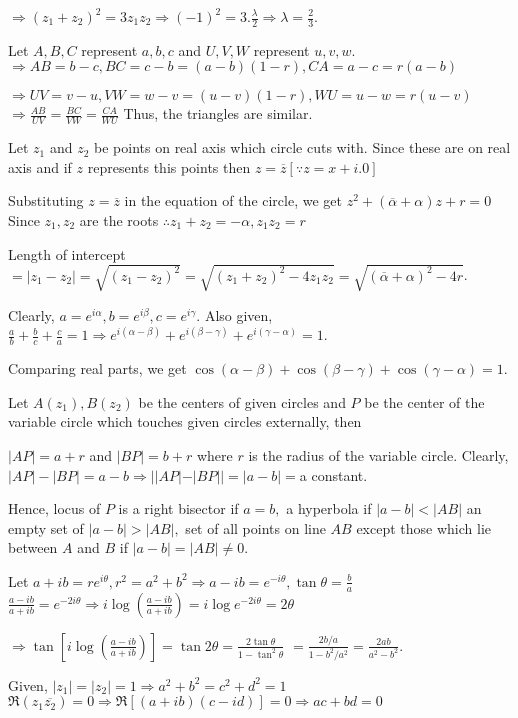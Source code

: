   $\Rightarrow (z_1 + z_2)^2 = 3z_1z_2 \Rightarrow (-1)^2 = 3.\frac{\lambda}{2}\Rightarrow \lambda =
  \frac{2}{3}$.
\item Let $A, B, C$ represent $a,b,c$ and $U, V, W$ represent $u, v, w.$
  $\Rightarrow AB = b - c, BC = c - b = (a - b)(1 - r), CA = a - c = r(a - b)$

  $\Rightarrow UV = v - u, VW = w - v = (u - v)(1 - r), WU = u - w = r(u - v)$
  $\Rightarrow \frac{AB}{UV} = \frac{BC}{VW} = \frac{CA}{WU}$
  Thus, the triangles are similar.
\item Let $z_1$ and $z_2$ be points on real axis which circle cuts with. Since these are on real axis and if $z$
  represents this points then $z = \overline{z}[\because z = x + i.0]$

  Substituting $z = \overline{z}$ in the equation of the circle, we get $z^2 + (\overline{\alpha} + \alpha)z + r = 0$
  Since $z_1, z_2$ are the roots $\therefore z_1 + z_2 = -\alpha, z_1z_2 = r$

  Length of intercept $=|z_1 - z_2| = \sqrt{(z_1 - z_2)^2} = \sqrt{(z_1 + z_2)^2 - 4z_1z_2} = \sqrt{(\overline{\alpha} + \alpha)^2
    - 4r}$.
\item Clearly, $a = e^{i\alpha}, b = e^{i\beta}, c= e^{i\gamma}$.
  Also given, $\frac{a}{b} + \frac{b}{c} + \frac{c}{a} = 1\Rightarrow e^{i(\alpha - \beta)} + e^{i(\beta - \gamma)} + e^{i(\gamma -
    \alpha)} = 1$.

  Comparing real parts, we get $\cos(\alpha - \beta) + \cos(\beta - \gamma) + \cos(\gamma - \alpha) = 1$.
\item Let $A(z_1), B(z_2)$ be the centers of given circles and $P$ be the center of the variable circle which
  touches given circles externally, then

  $|AP| = a + r$ and $|BP| = b + r$ where $r$ is the radius of the variable circle. Clearly,
  $|AP| - |BP| = a - b \Rightarrow ||AP| - |BP|| = |a - b| = $a constant.

  Hence, locus of $P$ is a right bisector if $a = b,$ a hyperbola if $|a - b| < |AB|$ an empty set of $|a - b|>|AB|,$ set of all
  points on line $AB$ except those which lie between $A$ and $B$ if $|a - b| = |AB|\neq 0.$
\item Let $a + ib = re^{i\theta}, r^2 = a^2 + b^2 \Rightarrow a - ib = e^{-i\theta}, \tan\theta = \frac{b}{a}$
  $\frac{a - ib}{a + ib} = e^{-2i\theta} \Rightarrow i\log\left(\frac{a - ib}{a + ib}\right) = i\log e^{-2i\theta} = 2\theta$

  $\Rightarrow \tan\left[i\log\left(\frac{a - ib}{a + ib}\right)\right] = \tan2\theta = \frac{2\tan\theta}{1 - \tan^2\theta}$
  $= \frac{2b/a}{1 - b^2/a^2} = \frac{2ab}{a^2 - b^2}$.
\item Given, $|z_1| = |z_2| = 1\Rightarrow a^2 + b^2 = c^2 + d^2 = 1$
  $\Re(z_1\overline{z_2}) = 0 \Rightarrow \Re[(a + ib)(c - id)] = 0 \Rightarrow ac + bd = 0$

